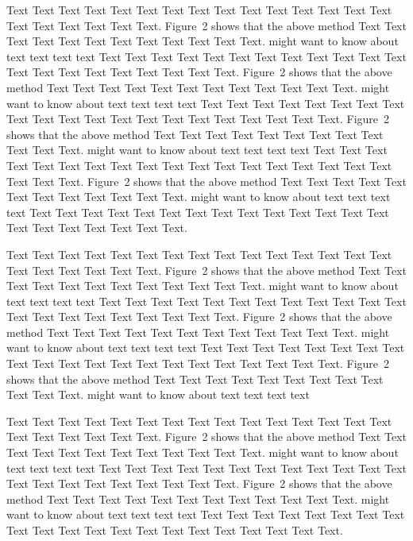 \documentclass{bioinfo}
\begin{document}
Text Text Text Text Text Text  Text Text Text Text Text Text Text
Text Text  Text Text Text Text Text Text.
Figure~2\vphantom{\ref{nextstrain}} shows that the above method  Text
Text Text Text  Text Text Text Text Text Text  Text Text.
\citealp{neher2015nextflu} might want to know about text text text text
Text Text Text Text Text Text Text Text Text Text Text Text Text
Text Text Text Text Text Text Text Text.
Figure~2\vphantom{\ref{nextstrain}} shows that the above method  Text
Text Text Text Text Text Text Text Text Text  Text Text.
\citealp{neher2015nextflu} might want to know about text text text text
Text Text Text Text Text Text  Text Text Text Text Text Text Text
Text Text Text Text Text Text Text Text.
Figure~2\vphantom{\ref{nextstrain}} shows that the above method  Text
Text Text Text Text Text Text Text Text Text  Text Text.
\citealp{neher2015nextflu} might want to know about text text text text
Text Text Text Text Text Text  Text Text Text Text Text Text Text
Text Text Text Text Text Text Text Text.
Figure~2\vphantom{\ref{nextstrain}} shows that the above method Text
Text Text Text Text Text Text Text Text Text Text Text.
\citealp{neher2015nextflu} might want to know about text text text text
Text Text Text Text Text Text  Text Text Text Text Text Text Text
Text Text Text Text Text Text Text Text.

Text Text Text Text Text Text  Text Text Text Text Text Text Text
Text Text  Text Text Text Text Text Text.
Figure~2\vphantom{\ref{nextstrain}} shows that the above method  Text
Text Text Text  Text Text Text Text Text Text  Text Text.
\citealp{neher2015nextflu} might want to know about  text text text text
Text Text Text Text Text Text  Text Text Text Text Text Text Text
Text Text  Text Text Text Text Text Text.
Figure~2\vphantom{\ref{nextstrain}} shows that the above method  Text
Text Text Text  Text Text Text Text Text Text  Text Text.
\citealp{neher2015nextflu} might want to know about  text text text text
Text Text Text Text Text Text Text Text Text Text Text Text Text
Text Text  Text Text Text Text Text Text.
Figure~2\vphantom{\ref{nextstrain}} shows that the above method  Text
Text Text Text  Text Text Text Text Text Text  Text Text.
\citealp{neher2015nextflu} might want to know about  text text text text

Text Text Text Text Text Text  Text Text Text Text Text Text Text
Text Text  Text Text Text Text Text Text.
Figure~2\vphantom{\ref{nextstrain}} shows that the above method  Text
Text Text Text  Text Text Text Text Text Text  Text Text.
\citealp{neher2015nextflu} might want to know about  text text text text
Text Text Text Text Text Text  Text Text Text Text Text Text Text
Text Text  Text Text Text Text Text Text.
Figure~2\vphantom{\ref{nextstrain}} shows that the above method  Text
Text Text Text  Text Text Text Text Text Text  Text Text.
\citealp{neher2015nextflu} might want to know about  text text text text
Text Text Text Text Text Text Text Text Text Text Text Text Text
Text Text  Text Text Text Text Text Text.
\end{document}
